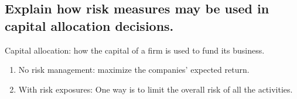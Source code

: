 \documentclass{article}
\newcommand{\be}{\begin{enumerate}}
\newcommand{\ee}{\end{enumerate}}
\begin{document}
\subsection{Explain how risk measures may be used in capital allocation decisions.}
Capital allocation: how the capital of a firm is used to fund its business.
\be
    \item No risk management: maximize the companies' expected return.
    \item With risk exposures: One way is to limit the overall risk of all the activities.
\ee
\end{document}
